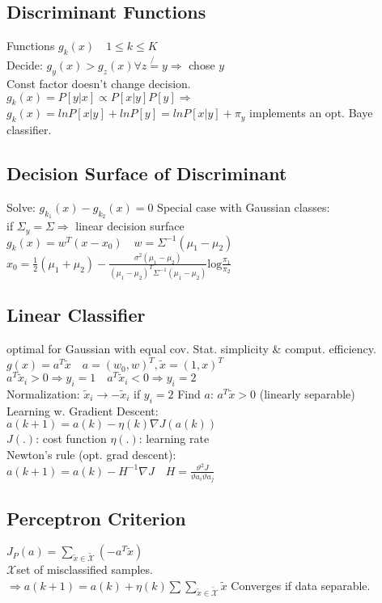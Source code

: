 \subsection*{Discriminant Functions}
Functions $g_k(x)\quad1\leq k\leq K$\\
Decide: $g_y(x){>}g_z(x)\forall z \not{=} y {\Rightarrow}$ chose $y$\\
Const factor doesn't change decision.\\
$g_k(x)=P[y|x]\propto P[x|y]P[y] \Rightarrow$\\
$g_k(x){=}lnP[x|y]+lnP[y]{=}lnP[x|y]+\pi_y$
implements an opt. Baye classifier.

\subsection*{Decision Surface of Discriminant}
Solve: $g_{k_1}(x)-g_{k_2}(x)=0$
Special case with Gaussian classes:\\
if $\Sigma_y = \Sigma \Rightarrow$ linear decision surface
$g_k(x){=}w^T(x-x_0)\quad w{=}\Sigma^{-1}(\mu_1{-}\mu_2)$\\
$x_0{=}\frac{1}{2}(\mu_1{+}\mu_2){-}\frac{\sigma^2(\mu_1-\mu_2)}{(\mu_1-\mu_2)^T\Sigma^{-1}(\mu_1-\mu_2)}\mathrm{log}\frac{\pi_1}{\pi_2}$

\subsection*{Linear Classifier}
optimal for Gaussian with equal cov. Stat. simplicity \& comput. efficiency.
$g(x)=a^T\tilde{x}\quad a=(w_0,w)^T, \tilde{x}=(1,x)^T$\\
$a^T\tilde{x}_i>0 \Rightarrow y_i=1\quad a^T\tilde{x}_i<0 \Rightarrow y_i=2$\\
Normalization: $\tilde{x}_i\rightarrow-\tilde{x}_i$ if $y_i=2$
Find $a$: $a^T\tilde{x}>0$ (linearly separable)\\
Learning w. Gradient Descent:\\
$a(k+1)=a(k)-\eta(k)\nabla J(a(k))$\\
$J(.)$: cost function $\eta(.)$: learning rate\\
Newton's rule (opt. grad descent):\\
$a(k+1)=a(k)-H^{-1}\nabla J\quad H=\frac{\vartheta^2 J}{\vartheta a_i \vartheta a_j}$
\subsection*{Perceptron Criterion}
$J_P(a)=\sum_{\tilde{x}\in\tilde{\mathcal{X}}}(-a^T\tilde{x})$\\
$\mathcal{X}$set of misclassified samples.\\
$\Rightarrow a(k+1)=a(k)+\eta(k)\sum \sum_{\tilde{x}\in\tilde{\mathcal{X}}} \tilde{x}$
Converges if data separable.

